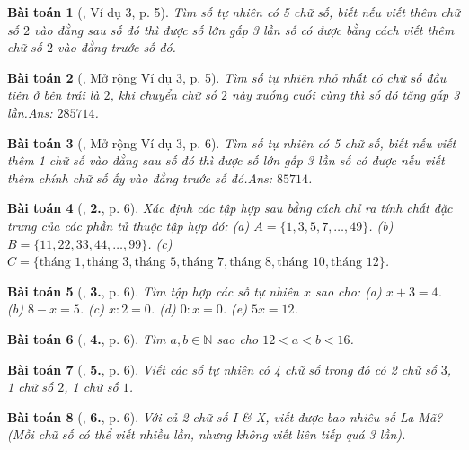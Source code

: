 \documentclass{article}
\newtheorem{baitoan}{Bài toán}
\begin{document}
\begin{baitoan}[\cite{Binh_Toan_6_tap_1}, Ví dụ 3, p. 5]
	Tìm số tự nhiên có 5 chữ số, biết nếu viết thêm chữ số $2$ vào đằng sau số đó thì được số lớn gấp 3 lần số có được bằng cách viết thêm chữ số $2$ vào đằng trước số đó.
\end{baitoan}

\begin{baitoan}[\cite{Binh_Toan_6_tap_1}, Mở rộng Ví dụ 3, p. 5]
	Tìm số tự nhiên nhỏ nhất có chữ số đầu tiên ở bên trái là $2$, khi chuyển chữ số $2$ này xuống cuối cùng thì số đó tăng gấp 3 lần.\hfill{\sf Ans:} $285714$.
\end{baitoan}

\begin{baitoan}[\cite{Binh_Toan_6_tap_1}, Mở rộng Ví dụ 3, p. 6]
	Tìm số tự nhiên có 5 chữ số, biết nếu viết thêm 1 chữ số vào đằng sau số đó thì được số lớn gấp 3 lần số có được nếu viết thêm chính chữ số ấy vào đằng trước số đó.\hfill{\sf Ans:} $85714$.
\end{baitoan}

\begin{baitoan}[\cite{Binh_Toan_6_tap_1}, \textbf{2.}, p. 6]
	Xác định các tập hợp sau bằng cách chỉ ra tính chất đặc trưng của các phần tử thuộc tập hợp đó: (a) $A = \{1,3,5,7,\ldots,49\}$. (b) $B = \{11,22,33,44,\ldots,99\}$. (c) $C = \{\mbox{tháng } 1,\mbox{tháng } 3,\mbox{tháng } 5,\mbox{tháng } 7,\mbox{tháng } 8,\mbox{tháng } 10,\mbox{tháng } 12\}$.
\end{baitoan}

\begin{baitoan}[\cite{Binh_Toan_6_tap_1}, \textbf{3.}, p. 6]
	Tìm tập hợp các số tự nhiên $x$ sao cho: (a) $x + 3 = 4$. (b) $8 - x = 5$. (c) $x:2 = 0$. (d) $0:x = 0$. (e) $5x = 12$.
\end{baitoan}

\begin{baitoan}[\cite{Binh_Toan_6_tap_1}, \textbf{4.}, p. 6]
	Tìm $a,b\in\mathbb{N}$ sao cho $12 < a < b < 16$.
\end{baitoan}

\begin{baitoan}[\cite{Binh_Toan_6_tap_1}, \textbf{5.}, p. 6]
	Viết các số tự nhiên có 4 chữ số trong đó có 2 chữ số $3$, 1 chữ số $2$, 1 chữ số $1$.
\end{baitoan}

\begin{baitoan}[\cite{Binh_Toan_6_tap_1}, \textbf{6.}, p. 6]
	Với cả 2 chữ số I \& X, viết được bao nhiêu số La Mã? (Mỗi chữ số có thể viết nhiều lần, nhưng không viết liên tiếp quá 3 lần).
\end{baitoan}
\end{document}
